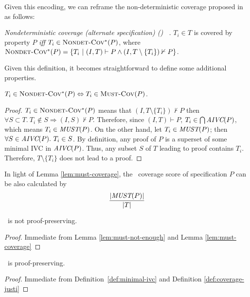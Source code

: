 Given this encoding, we can reframe the non-deterministic coverage proposed in \cite{chockler2010coverage} as follows:

\begin{definition} {\emph{Nondeterministic coverage (alternate specification) (\nondetcovalt) ~\cite{chockler2010coverage}.} }
\label{def:non-det-2}
$T_i \in T$ is covered by property $P$ \emph{iff} $T_i \in \text{\sc Nondet-Cov$^{*}$} (P)$, where
$\text{\sc Nondet-Cov$^{*}$} (P) = \{T_i~|~ (I, T) \vdash P \wedge (I, T \setminus \{T_i\}) \nvdash P\}$.
\end{definition}
\noindent Given this definition, it becomes straightforward to define some additional properties.

\begin{lemma}
  \label{lem:must-coverage}
$T_i \in \text{\sc Nondet-Cov$^{*}$} (P) \Leftrightarrow T_i \in \text{\sc Must-Cov}(P)$.
\end{lemma}
\begin{proof}
$T_i \in \text{\sc Nondet-Cov$^{*}$} (P)$ means that $(I, T \setminus \{ T_i \}) \nvdash P$ then
$\forall S \subset T .~ T_i \notin S \Rightarrow (I, S) \nvdash P$.
Therefore, since $(I, T) \vdash P$, $T_i \in \bigcap \textit{AIVC}(P)$, which means  $T_i \in \textit{MUST}(P)$.
On the other hand, let $T_i \in \textit{MUST}(P)$; then $\forall S \in \textit{AIVC}(P).~ T_i \in S$.
By definition, any proof of $P$ is a superset of some minimal IVC in $\textit{AIVC}(P)$.
Thus, any subset $S$ of $T$ leading to proof contains $T_i$.
Therefore, $T \setminus \{ T_i \}$ does not lead to a proof.

\end{proof}
\vspace{2mm}

In light of Lemma \ref{lem:must-coverage}, the \nondetcovalt\ coverage score of specification $P$ can be also calculated by
$$\frac{|\textit{MUST}(P)|}{|T|}$$


%
\begin{corollary}
\label{cor:must-not-provable}
\nondetcovalt\ is not proof-preserving.
\end{corollary}
\begin{proof}
Immediate from Lemma \ref{lem:must-not-enough} and Lemma \ref{lem:must-coverage}
\end{proof}
\vspace{2mm}
\begin{corollary}
\label{cor:ivc-provable}
\ivccov\ is proof-preserving.
\end{corollary}
\begin{proof}
Immediate from Definition~\ref{def:minimal-ivc} and Definition \ref{def:coverage-justi}
\end{proof}
\vspace{2mm}

